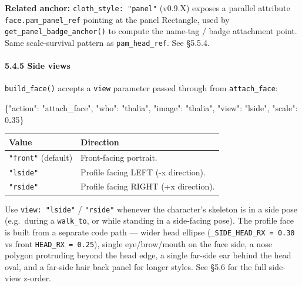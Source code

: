 \documentclass[
  11pt,
]{book}
\newenvironment{Shaded}{}{}
\newcommand{\DataTypeTok}[1]{\textcolor[rgb]{0.56,0.13,0.00}{#1}}
\newcommand{\DecValTok}[1]{\textcolor[rgb]{0.25,0.63,0.44}{#1}}
\newcommand{\ErrorTok}[1]{\textcolor[rgb]{1.00,0.00,0.00}{\textbf{#1}}}
\newcommand{\FunctionTok}[1]{\textcolor[rgb]{0.02,0.16,0.49}{#1}}
\newcommand{\StringTok}[1]{\textcolor[rgb]{0.25,0.44,0.63}{#1}}
\begin{document}
\textbf{Related anchor:} \texttt{cloth\_style:\ "panel"} (v0.9.X)
exposes a parallel attribute \texttt{face.pam\_panel\_ref} pointing at
the panel Rectangle, used by \texttt{get\_panel\_badge\_anchor()} to
compute the name-tag / badge attachment point. Same scale-survival
pattern as \texttt{pam\_head\_ref}. See §5.5.4.

\paragraph{5.4.5 Side views}\label{side-views}

\texttt{build\_face()} accepts a \texttt{view} parameter passed through
from \texttt{attach\_face}:

\begin{Shaded}
\begin{Highlighting}[]
\FunctionTok{\{}\DataTypeTok{"action"}\FunctionTok{:} \StringTok{"attach\_face"}\FunctionTok{,} \DataTypeTok{"who"}\FunctionTok{:} \StringTok{"thalia"}\FunctionTok{,}
 \DataTypeTok{"image"}\FunctionTok{:} \StringTok{"thalia"}\FunctionTok{,} \DataTypeTok{"view"}\FunctionTok{:} \StringTok{"lside"}\FunctionTok{,} \DataTypeTok{"scale"}\FunctionTok{:} \DecValTok{0}\ErrorTok{.}\DecValTok{35}\FunctionTok{\}}
\end{Highlighting}
\end{Shaded}

\begin{longtable}[]{@{}ll@{}}
\toprule\noalign{}
Value & Direction \\
\midrule\noalign{}
\endhead
\bottomrule\noalign{}
\endlastfoot
\texttt{"front"} (default) & Front-facing portrait. \\
\texttt{"lside"} & Profile facing LEFT (-x direction). \\
\texttt{"rside"} & Profile facing RIGHT (+x direction). \\
\end{longtable}

Use \texttt{view:\ "lside"} / \texttt{"rside"} whenever the character's
skeleton is in a side pose (e.g.~during a \texttt{walk\_to}, or while
standing in a side-facing pose). The profile face is built from a
separate code path --- wider head ellipse
(\texttt{\_SIDE\_HEAD\_RX\ =\ 0.30} vs front
\texttt{HEAD\_RX\ =\ 0.25}), single eye/brow/mouth on the face side, a
nose polygon protruding beyond the head edge, a single far-side ear
behind the head oval, and a far-side hair back panel for longer styles.
See §5.6 for the full side-view z-order.
\end{document}
